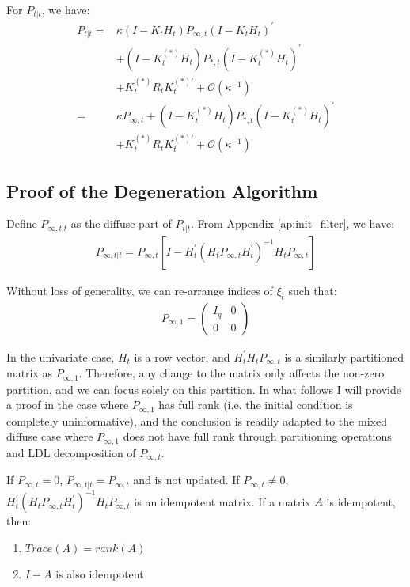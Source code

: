 \documentclass[12pt]{article}
\newenvironment{boenumerate}
    {\begin{enumerate}\renewcommand\labelenumi{\textbf\theenumi}}
    {\end{enumerate}}
\numberwithin{equation}{section}
\begin{document}
For $P_{t|t}$, we have:
\begin{align}
    P_{t|t} =& \kappa (I-K_tH_t)P_{\infty,t}(I-K_tH_t)^{'} \nonumber \\
    &+ (I-K_t^{(*)}H_t)P_{*,t}(I-K_t^{(*)}H_t)^{'} \nonumber \\
    &+ K_t^{(*)}R_tK_t^{(*)'} + \mathcal{O}(\kappa^{-1}) \nonumber \\
    =& \kappa P_{\infty, t} + (I-K_t^{(*)}H_t)P_{*,t}(I-K_t^{(*)}H_t)^{'} \label{eq:diff_P2} \\
    &+ K_t^{(*)}R_tK_t^{(*)'} + \mathcal{O}(\kappa^{-1}) \nonumber
\end{align}

\subsection{Proof of the Degeneration Algorithm} \label{ap:transition}
Define $P_{\infty,t|t}$ as the diffuse part of $P_{t|t}$. From Appendix \ref{ap:init_filter}, we have:
\begin{align*}
    P_{\infty,t|t} = P_{\infty,t}[I - H_t^{'}(H_tP_{\infty,t}H_t^{'})^{-1}H_tP_{\infty,t}]
\end{align*}

Without loss of generality, we can re-arrange indices of $\xi_t$ such that:
\begin{align*}
    P_{\infty,1}=\begin{pmatrix}
        I_q & 0 \\
        0 & 0
    \end{pmatrix}
\end{align*}

In the univariate case, $H_t$ is a row vector, and $H_t^{'}H_tP_{\infty,t}$ is a similarly partitioned matrix as $P_{\infty, 1}$. Therefore, any change to the matrix only affects the non-zero partition, and we can focus solely on this partition. In what follows I will provide a proof in the case where $P_{\infty,1}$ has full rank (i.e. the initial condition is completely uninformative), and the conclusion is readily adapted to the mixed diffuse case where $P_{\infty,1}$ does not have full rank through partitioning operations and LDL decomposition of $P_{\infty,t}$. 

If $P_{\infty,t}=0$, $P_{\infty,t|t} = P_{\infty,t}$ and is not updated. If $P_{\infty,t}\neq0$, $H_t^{'}(H_tP_{\infty,t}H_t^{'})^{-1}H_tP_{\infty,t}$ is an idempotent matrix. If a matrix $A$ is idempotent, then:
\begin{boenumerate}
    \item $Trace(A)=rank(A)$
    \item $I-A$ is also idempotent
\end{boenumerate}
\end{document}

